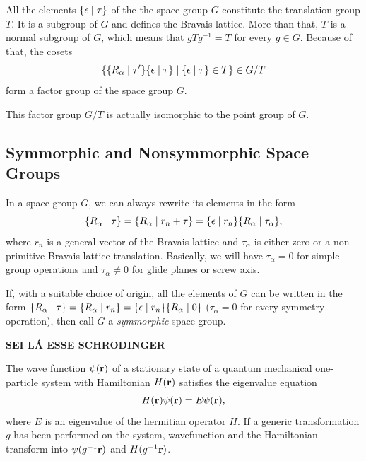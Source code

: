 All the elements $\{ \epsilon \mid \tau \}$ of the the space group $G$ constitute the translation group $T$. It is a subgroup of $G$ and defines the Bravais lattice. More than that, $T$ is a normal subgroup of $G$, which means that $g T g^{-1} = T$ for every $g \in G$. Because of that, the cosets
$$
\{ \{ R_\alpha \mid \tau' \} \{ \epsilon \mid \tau \} \mid \{ \epsilon \mid \tau \} \in T \} \in G/T
$$
form a factor group of the space group $G$.

This factor group $G/T$ is actually isomorphic to the point group of $G$.

\subsection{Symmorphic and Nonsymmorphic Space Groups} \label{sec:symmorphic_groups}

In a space group $G$, we can always rewrite its elements in the form
$$
\{ R_\alpha \mid \tau \} = \{ R_\alpha \mid r_n + \tau \} = \{ \epsilon \mid r_n \} \{ R_\alpha \mid \tau_\alpha \},
$$
where $r_n$ is a general vector of the Bravais lattice and $\tau_\alpha$ is either zero or a non-primitive Bravais lattice translation. Basically, we will have $\tau_\alpha = 0$ for simple group operations and $\tau_\alpha \neq 0$ for glide planes or screw axis.

If, with a suitable choice of origin, all the elements of $G$ can be written in the form $\{ R_\alpha \mid \tau \} = \{ R_\alpha \mid r_n \} = \{ \epsilon \mid r_n \} \{ R_\alpha \mid 0 \}$ ($\tau_\alpha = 0$ for every symmetry operation), then call $G$ a \textit{symmorphic} space group.


\textbf{SEI LÁ ESSE SCHRODINGER}

The wave function $\psi({\vb{r}})$ of a stationary state of a quantum mechanical one-particle system with Hamiltonian $H({\vb{r}})$ satisfies the eigenvalue equation
\begin{equation} \label{eq:schrodinger}
H({\vb{r}}) \psi({\vb{r}}) = E \psi({\vb{r}}),
\end{equation}
where $E$ is an eigenvalue of the hermitian operator $H$. If a generic transformation $g$ has been performed on the system, wavefunction and the Hamiltonian transform into $\psi(g^{-1}{\vb{r}})$ and $H(g^{-1}{\vb{r}})$.


